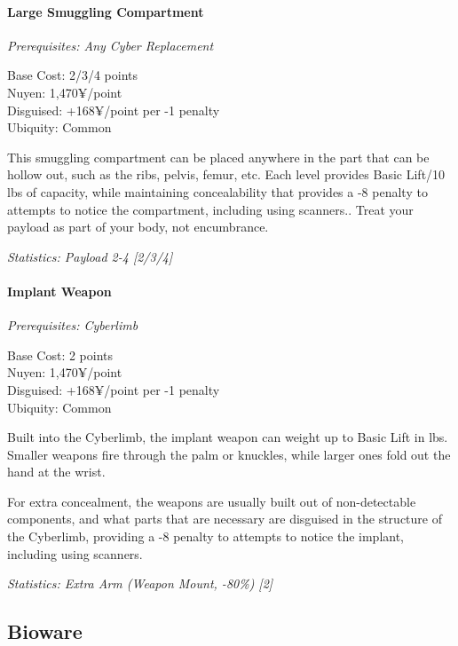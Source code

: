 \begin{multicols*}{3}
	\paragraph{Large Smuggling Compartment}
	\textit{Prerequisites: Any Cyber Replacement}
	\begin{flushright}
		Base Cost: 2/3/4 points\\
		Nuyen: 1,470¥/point\\
		Disguised: +168¥/point per -1 penalty\\
		Ubiquity: Common\\
	\end{flushright}
	
	This smuggling compartment can be placed anywhere in the part that can be hollow out, such as the ribs, pelvis, femur, etc. Each level provides Basic Lift/10 lbs of capacity, while maintaining concealability that provides a -8 penalty to attempts to notice the compartment, including using scanners.. Treat your payload as part of your body, not encumbrance. 
	
	\textit{\textcolor{OliveGreen}{Statistics: Payload 2-4 [2/3/4]}}
	
	\paragraph{Implant Weapon}
	\textit{Prerequisites: Cyberlimb}
	\begin{flushright}
		Base Cost: 2 points\\
		Nuyen: 1,470¥/point\\
		Disguised: +168¥/point per -1 penalty\\
		Ubiquity: Common\\
	\end{flushright}
	
	Built into the Cyberlimb, the implant weapon can weight up to Basic Lift in lbs. Smaller weapons fire through the palm or knuckles, while larger ones fold out the hand at the wrist.
	
	For extra concealment, the weapons are usually built out of non-detectable components, and what parts that are necessary are disguised in the structure of the Cyberlimb, providing a -8 penalty to attempts to notice the implant, including using scanners.
	
	\textit{\textcolor{OliveGreen}{Statistics: Extra Arm (Weapon Mount, -80\%) [2]}}
	\subsection{Bioware}
	

\end{multicols*}

